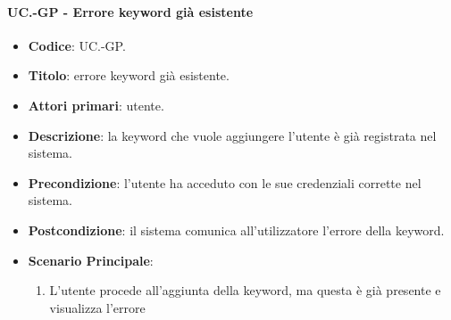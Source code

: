 	\paragraph{UC\theuccount.\thesubuccount-GP - Errore keyword già esistente}
	
	\begin{itemize}
		\item \textbf{Codice}: UC\theuccount.\thesubuccount-GP.
		\item \textbf{Titolo}: errore keyword già esistente.
		\item \textbf{Attori primari}: utente.
		\item \textbf{Descrizione}: la keyword che vuole aggiungere l'utente è già registrata nel sistema.
		\item \textbf{Precondizione}:  l’utente ha acceduto con le sue credenziali corrette nel sistema.
		\item \textbf{Postcondizione}: il sistema comunica all’utilizzatore l’errore della keyword.
		\item \textbf{Scenario Principale}:
		\begin{enumerate}
			\item L'utente procede all'aggiunta della keyword, ma questa è già presente e visualizza l'errore
		\end{enumerate}
	\end{itemize}